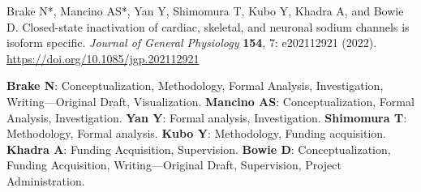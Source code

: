 \noindent
\hangindent=1cm
Brake N*, Mancino AS*, Yan Y, Shimomura T, Kubo Y, Khadra A, and Bowie D. Closed-state inactivation of cardiac, skeletal, and neuronal sodium channels is isoform specific. \textit{Journal of General Physiology} \textbf{154}, 7: e202112921 (2022). \url{https://doi.org/10.1085/jgp.202112921}

{\small \textbf{Brake N}: Conceptualization, Methodology, Formal Analysis, Investigation, Writing—Original Draft, Visualization.  \textbf{Mancino AS}: Conceptualization, Formal Analysis, Investigation. \textbf{Yan Y}: Formal analysis, Investigation. \textbf{Shimomura T}: Methodology, Formal analysis. \textbf{Kubo Y}: Methodology, Funding acquisition. \textbf{Khadra A}: Funding Acquisition, Supervision. \textbf{Bowie D}: Conceptualization, Funding Acquisition, Writing—Original Draft, Supervision, Project Administration.}
